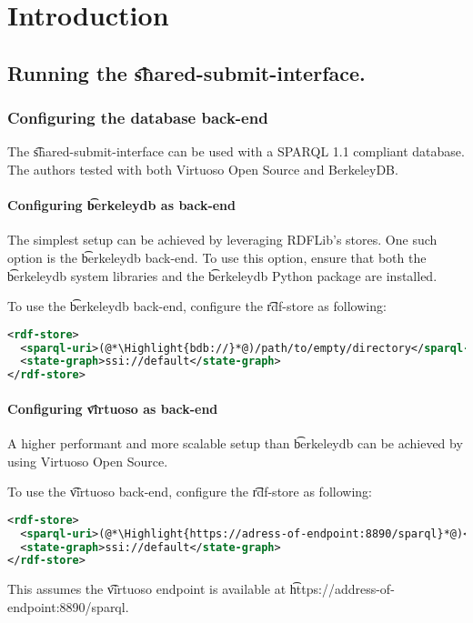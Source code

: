 \chapter{Introduction}

\section{Running the \t{shared-submit-interface}.}

\subsection{Configuring the database back-end}

The \t{shared-submit-interface} can be used with a SPARQL 1.1
compliant database.  The authors tested with both Virtuoso Open Source
and BerkeleyDB.

\subsubsection{Configuring \t{berkeleydb} as back-end}

The simplest setup can be achieved by leveraging RDFLib's
stores.  One such option is the \t{berkeleydb} back-end. To use this option,
ensure that both the \t{berkeleydb} system libraries and the \t{berkeleydb}
Python package are installed.

To use the \t{berkeleydb} back-end, configure the \t{rdf-store} as following:
\begin{lstlisting}[language=xml]
<rdf-store>
  <sparql-uri>(@*\Highlight{bdb://}*@)/path/to/empty/directory</sparql-uri>
  <state-graph>ssi://default</state-graph>
</rdf-store>
\end{lstlisting}

\subsubsection{Configuring \t{virtuoso} as back-end}

A higher performant and more scalable setup than \t{berkeleydb} can be
achieved by using Virtuoso Open Source.

To use the \t{virtuoso} back-end, configure the \t{rdf-store} as following:
\begin{lstlisting}[language=xml]
<rdf-store>
  <sparql-uri>(@*\Highlight{https://adress-of-endpoint:8890/sparql}*@)</sparql-uri>
  <state-graph>ssi://default</state-graph>
</rdf-store>
\end{lstlisting}

This assumes the \t{virtuoso} endpoint is available at
\t{https://address-of-endpoint:8890/sparql}.

